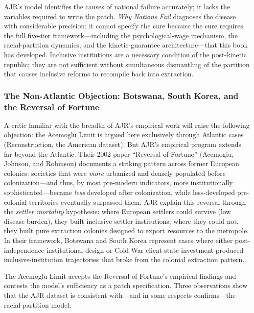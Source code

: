 AJR's model identifies the causes of national failure accurately; it lacks the variables required to write the patch. \textit{Why Nations Fail} diagnoses the disease with considerable precision; it cannot specify the cure because the cure requires the full five-tier framework---including the psychological-wage mechanism, the racial-partition dynamics, and the kinetic-guarantee architecture---that this book has developed. Inclusive institutions are a necessary condition of the post-kinetic republic; they are not sufficient without simultaneous dismantling of the partition that causes inclusive reforms to recompile back into extraction.

\subsubsection{The Non-Atlantic Objection: Botswana, South Korea, and the Reversal of Fortune}

A critic familiar with the breadth of AJR's empirical work will raise the following objection: the Acemoglu Limit is argued here exclusively through Atlantic cases (Reconstruction, the American dataset). But AJR's empirical program extends far beyond the Atlantic. Their 2002 paper ``Reversal of Fortune'' \cite{ajr_reversal} (Acemoglu, Johnson, and Robinson) documents a striking pattern across former European colonies: societies that were \textit{more} urbanized and densely populated before colonization---and thus, by most pre-modern indicators, more institutionally sophisticated---became \textit{less} developed after colonization, while less-developed pre-colonial territories eventually surpassed them. AJR explain this reversal through the \textit{settler mortality} hypothesis: where European settlers could survive (low disease burden), they built inclusive settler institutions; where they could not, they built pure extraction colonies designed to export resources to the metropole. In their framework, Botswana and South Korea represent cases where either post-independence institutional design or Cold War client-state investment produced inclusive-institution trajectories that broke from the colonial extraction pattern.

The Acemoglu Limit accepts the Reversal of Fortune's empirical findings \cite{ajr_reversal} and contests the model's sufficiency as a patch specification. Three observations show that the AJR dataset is consistent with---and in some respects confirms---the racial-partition model:

